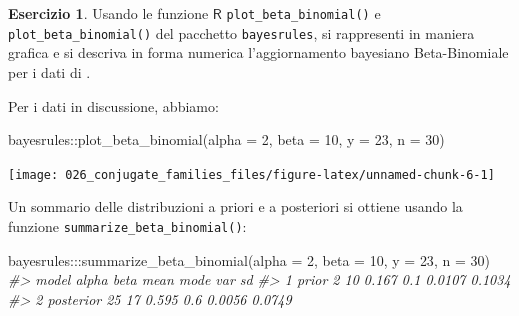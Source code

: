 \documentclass[
  10pt,
  italian,
  a4paper,
  extrafontsizes,onecolumn,openright
  ]{memoir}
\newenvironment{Shaded}{\begin{snugshade}}{\end{snugshade}}
\newcommand{\AttributeTok}[1]{\textcolor[rgb]{0.77,0.63,0.00}{#1}}
\newcommand{\CommentTok}[1]{\textcolor[rgb]{0.56,0.35,0.01}{\textit{#1}}}
\newcommand{\DecValTok}[1]{\textcolor[rgb]{0.00,0.00,0.81}{#1}}
\newcommand{\FunctionTok}[1]{\textcolor[rgb]{0.00,0.00,0.00}{#1}}
\newcommand{\NormalTok}[1]{#1}
\newcommand{\SpecialCharTok}[1]{\textcolor[rgb]{0.00,0.00,0.00}{#1}}
\newcommand{\R}{\textsf{R}} %
\theoremstyle{definition}
\theoremstyle{definition}
\theoremstyle{definition}
\newtheorem{exercise}{Esercizio}[chapter]
\theoremstyle{definition}
\theoremstyle{remark}
\begin{document}
\begin{exercise}

Usando le funzione \(\R\) \texttt{plot\_beta\_binomial()} e \texttt{plot\_beta\_binomial()} del pacchetto \texttt{bayesrules}, si rappresenti in maniera grafica e si descriva in forma numerica l'aggiornamento bayesiano Beta-Binomiale per i dati di \textcite{zetschefuture2019}.

Per i dati in discussione, abbiamo:

\begin{Shaded}
\begin{Highlighting}[]
\NormalTok{bayesrules}\SpecialCharTok{::}\FunctionTok{plot\_beta\_binomial}\NormalTok{(}\AttributeTok{alpha =} \DecValTok{2}\NormalTok{, }\AttributeTok{beta =} \DecValTok{10}\NormalTok{, }\AttributeTok{y =} \DecValTok{23}\NormalTok{, }\AttributeTok{n =} \DecValTok{30}\NormalTok{)}
\end{Highlighting}
\end{Shaded}

\begin{center}\texttt{[image: 026\_conjugate\_families\_files/figure-latex/unnamed-chunk-6-1]} \end{center}

\noindent
Un sommario delle distribuzioni a priori e a posteriori si ottiene usando la funzione \texttt{summarize\_beta\_binomial()}:

\begin{Shaded}
\begin{Highlighting}[]
\NormalTok{bayesrules}\SpecialCharTok{:::}\FunctionTok{summarize\_beta\_binomial}\NormalTok{(}\AttributeTok{alpha =} \DecValTok{2}\NormalTok{, }\AttributeTok{beta =} \DecValTok{10}\NormalTok{, }\AttributeTok{y =} \DecValTok{23}\NormalTok{, }\AttributeTok{n =} \DecValTok{30}\NormalTok{)}
\CommentTok{\#\textgreater{}       model alpha beta  mean mode    var     sd}
\CommentTok{\#\textgreater{} 1     prior     2   10 0.167  0.1 0.0107 0.1034}
\CommentTok{\#\textgreater{} 2 posterior    25   17 0.595  0.6 0.0056 0.0749}
\end{Highlighting}
\end{Shaded}

\end{exercise}
\end{document}
